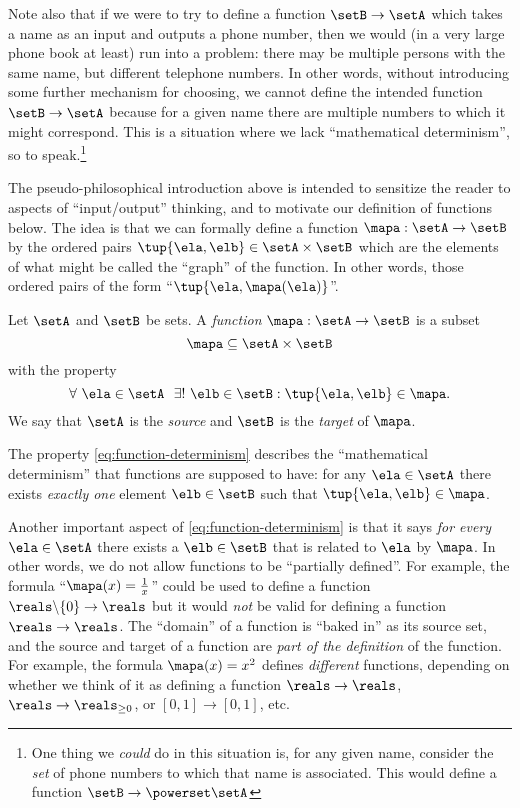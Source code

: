 Note also that if we were to try to define a function $\setB \to \setA$ which takes a name as an input and outputs a phone number, then we would (in a very large phone book at least) run into a problem: there may be multiple persons with the same name, but different telephone numbers. In other words, without introducing some further mechanism for choosing, we cannot define the intended function $\setB \to \setA$ because for a given name there are multiple numbers to which it might correspond. This is a situation where we lack ``mathematical determinism'', so to speak.\footnote{One thing we \emph{could} do in this situation is, for any given name, consider the \emph{set} of phone numbers to which that name is associated. This would define a function $\setB \to \powerset \setA$}

The pseudo-philosophical introduction above is intended to sensitize the reader to aspects of ``input/output'' thinking, and to motivate our definition of functions below. The idea is that we can formally define a function $\mapa: \setA \to \setB$ by the ordered pairs $\tup{\ela, \elb} \in \setA \times \setB$ which are the elements of what might be called the ``graph'' of the function. In other words, those ordered pairs of the form ``$\tup{\ela, \mapa(\ela)}$''.

\begin{definition}\label{def:function}
Let $\setA$ and $\setB$ be sets. A \emph{function} $\mapa: \setA \to \setB$ is a subset
\begin{equation}
\mapa \subseteq \setA \times \setB
\end{equation}
with the property 
\begin{equation}\label{eq:function-determinism}
\forall \ \ela \in \setA  \ \  \exists ! \ \elb \in \setB : \tup{\ela,\elb} \in \mapa.
\end{equation}
We say that $\setA$ is the \emph{source} and $\setB$ is the \emph{target} of $\mapa$. 
\end{definition}

The property \cref{eq:function-determinism} describes the ``mathematical determinism'' that functions are supposed to have: for any $\ela \in \setA$ there exists \emph{exactly one} element $\elb \in \setB$ such that $\tup{\ela, \elb} \in \mapa$. 

Another important aspect of \cref{eq:function-determinism} is that it says \emph{for every} $\ela \in \setA$ there exists a $\elb \in \setB$ that is related to $\ela$ by $\mapa$. In other words, we do not allow functions to be ``partially defined''. For example, the formula ``$\mapa(x) = \frac{1}{x}$'' could be used to define a function $\reals \backslash \{ 0 \} \to \reals$ but it would \emph{not} be valid for defining a function $\reals \to \reals$. The ``domain'' of a function is ``baked in'' as its source set, and the source and target of a function are \emph{part of the definition} of the function. For example, the formula $\mapa(x) = x^2$ defines \emph{different} functions, depending on whether we think of it as defining a function $\reals \to \reals$, $\reals \to \reals_{\geq 0}$, or $[0,1] \to [0,1]$, etc. 

